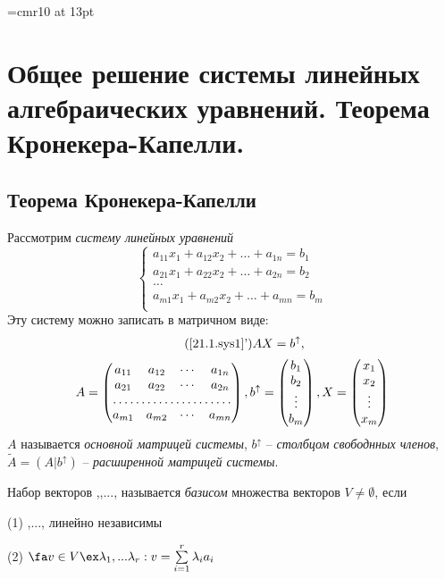 \font\Large=cmr10 at 13pt
\newcount\rowcount{}
\def\fudge#1{\smash{\hbox{\Large#1}}}
\def\doublyso{\kern+2em\smash{\vrule height \rowcount em depth .2em}\hidewidth}			%
\chapter{Общее решение системы линейных алгебраических уравнений. Теорема Кронекера-Капелли.}
\section{Теорема Кронекера-Капелли}
  Рассмотрим \textit{систему линейных уравнений}
  \begin{equation}\label{21.1.sys1}
  \left\lbrace\begin{array}{crl}
  a_{11}x_1+a_{12}x_2+\ldots+a_{1n}=b_1\\
  a_{21}x_1+a_{22}x_2+\ldots+a_{2n}=b_2\\
  \ldots \\
  a_{m1}x_1+a_{m2}x_2+\ldots+a_{mn}=b_m\\ 
  \end{array}\right.\end{equation}
  Эту систему можно записать в матричном виде:
  \begin{equation*}\tag{\ref{21.1.sys1}'}
  AX=b^{\uparrow},
  \end{equation*}
  \begin{equation*}
  A=\begin{pmatrix}
    a_{11} & a_{12} & \cdots & a_{1n} \\
    a_{21} & a_{22} & \cdots & a_{2n} \\
    \hdotsfor{4} \\
    a_{m1} & a_{m2} & \cdots & a_{mn} \\
    \end{pmatrix},
  b^\uparrow=\begin{pmatrix}
    b_1 \\ b_2 \\ \vdots \\ b_m \\
    \end{pmatrix},
  X=\begin{pmatrix}
    x_1 \\ x_2 \\ \vdots \\ x_m \\
    \end{pmatrix}
  \end{equation*}
  $A$ называется \textit{основной матрицей системы}, $b^\uparrow$ -- \textit{столбцом свободнных членов}, $\widetilde A = (A|b^\uparrow)$ -- \textit{расширенной матрицей системы}.
  \begin{defn}
  Набор векторов ,,..., называется \textit{базисом} множества векторов $V\neq \emptyset$, если
  
  (1) ,..., линейно независимы
  
  (2) $\fa v \in V \ex \lambda_1,...\lambda_r: v=\sum \limits_{i=1}^r\lambda_ia_i$
  \end{defn}
  
